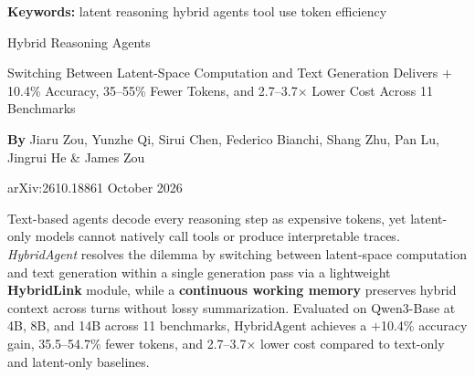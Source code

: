 \documentclass[10pt,twocolumn]{article}
\begin{document}
\setlength{\parindent}{0pt}
\setlength{\parskip}{4pt}

{\small\color{keywordgray}\textbf{Keywords:}
  latent reasoning \textbullet{}
  hybrid agents \textbullet{}
  tool use \textbullet{}
  token efficiency}\par\vspace{4pt}

{\LARGE\bfseries\raggedright
  Hybrid Reasoning Agents}\par\vspace{4pt}

{\large\itshape\raggedright
  Switching Between Latent-Space Computation and Text Generation
  Delivers $+$10.4\% Accuracy, 35--55\% Fewer Tokens, and
  2.7--3.7$\times$ Lower Cost Across 11 Benchmarks}\par\vspace{6pt}

{\small\textbf{By} Jiaru Zou, Yunzhe Qi, Sirui Chen, Federico Bianchi,
  Shang Zhu, Pan Lu, Jingrui He \& James Zou}\par\vspace{2pt}

{\small\color{keywordgray}arXiv:2610.18861 \textbullet{} October 2026}
\par\vspace{2pt}\noindent{\color{rulered}\rule{\columnwidth}{0.6pt}}\vspace{6pt}

Text-based agents decode every reasoning step as expensive tokens, yet
latent-only models cannot natively call tools or produce interpretable traces.
\emph{HybridAgent} resolves the dilemma by switching between latent-space
computation and text generation within a single generation pass via a
lightweight \textbf{HybridLink} module, while a \textbf{continuous working
memory} preserves hybrid context across turns without lossy summarization.
Evaluated on Qwen3-Base at 4B, 8B, and 14B across 11 benchmarks, HybridAgent
achieves a $+$10.4\% accuracy gain, 35.5--54.7\% fewer tokens, and
2.7--3.7$\times$ lower cost compared to text-only and latent-only baselines.
\end{document}
